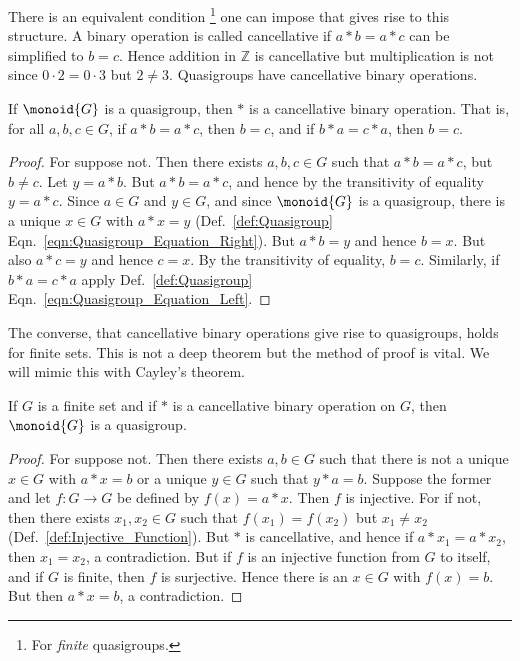         There is an equivalent condition%
        \footnote{%
            For \textit{finite} quasigroups.
        }
        one can impose that gives rise to this structure. A binary operation is
        called cancellative if $a*b=a*c$ can be simplified to $b=c$. Hence
        addition in $\mathbb{Z}$ is cancellative but multiplication is not since
        $0\cdot{2}=0\cdot{3}$ but $2\ne{3}$. Quasigroups have cancellative
        binary operations.
        \begin{theorem}
            If $\monoid{G}$ is a quasigroup, then $*$ is a cancellative binary
            operation. That is, for all $a,b,c\in{G}$, if $a*b=a*c$, then
            $b=c$, and if $b*a=c*a$, then $b=c$.
        \end{theorem}
        \begin{proof}
            For suppose not. Then there exists $a,b,c\in{G}$ such that
            $a*b=a*c$, but $b\ne{c}$. Let $y=a*b$. But $a*b=a*c$, and hence by
            the transitivity of equality $y=a*c$. Since $a\in{G}$ and $y\in{G}$,
            and since $\monoid{G}$ is a quasigroup, there is a unique $x\in{G}$
            with $a*x=y$ (Def.~\ref{def:Quasigroup}
            Eqn.~\ref{eqn:Quasigroup_Equation_Right}). But $a*b=y$ and hence
            $b=x$. But also $a*c=y$ and hence $c=x$. By the transitivity of
            equality, $b=c$. Similarly, if $b*a=c*a$ apply
            Def.~\ref{def:Quasigroup} Eqn.~\ref{eqn:Quasigroup_Equation_Left}.
        \end{proof}
        The converse, that cancellative binary operations give rise to
        quasigroups, holds for finite sets. This is not a deep theorem but the
        method of proof is vital. We will mimic this with Cayley's theorem.
        \begin{theorem}
            \label{thm:Finite_Cancellative_Op_is_Quasigroup}%
            If $G$ is a finite set and if $*$ is a cancellative binary operation
            on $G$, then $\monoid{G}$ is a quasigroup.
        \end{theorem}
        \begin{proof}
            For suppose not. Then there exists $a,b\in{G}$ such that there is
            not a unique $x\in{G}$ with $a*x=b$ or a unique $y\in{G}$ such that
            $y*a=b$. Suppose the former and let $f:G\rightarrow{G}$ be defined
            by $f(x)=a*x$. Then $f$ is injective. For if not, then there exists
            $x_{1},x_{2}\in{G}$ such that $f(x_{1})=f(x_{2})$ but
            $x_{1}\ne{x}_{2}$ (Def.~\ref{def:Injective_Function}). But $*$ is
            cancellative, and hence if $a*x_{1}=a*x_{2}$, then $x_{1}=x_{2}$,
            a contradiction. But if $f$ is an injective function from $G$ to
            itself, and if $G$ is finite, then $f$ is surjective. Hence there is
            an $x\in{G}$ with $f(x)=b$. But then $a*x=b$, a contradiction.
        \end{proof}
